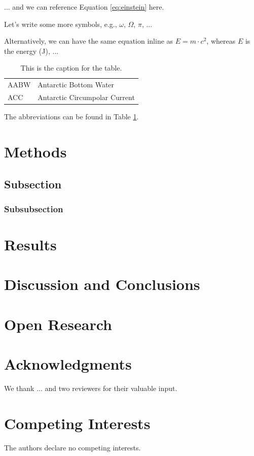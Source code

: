 \documentclass{agujournal2019}
\begin{document}
... and we can reference Equation \ref{eq:einstein} here.

Let's write some more symbols, e.g., $\omega$, $\Omega$, $\pi$, ...

Alternatively, we can have the same equation inline as $E = m \cdot c^2$, whereas $E$ is the energy (J), ...

\begin{table}
 \caption{This is the caption for the table.}
 \centering
 \begin{tabular}{l l}
 \hline
    AABW	& Antarctic Bottom Water\\
    ACC		& Antarctic Circumpolar Current\\
 \hline
\end{tabular}
\label{tab:abbreviations}
\end{table}
The abbreviations can be found in Table \ref{tab:abbreviations}.

\section{Methods} 
\subsection{Subsection}
\subsubsection{Subsubsection}
\section{Results}
\section{Discussion and Conclusions}
\section{Open Research} 
\section{Acknowledgments} We thank ... and two reviewers for their valuable input.
\section{Competing Interests} The authors declare no competing interests.

\pagebreak
\end{document}
